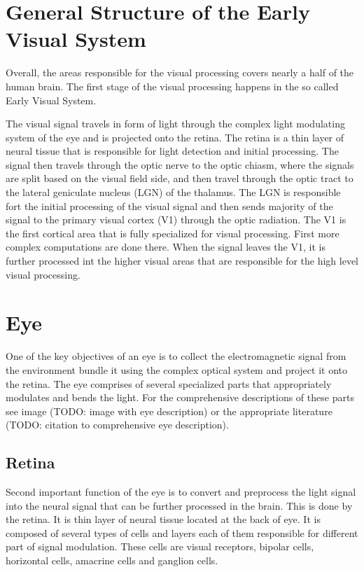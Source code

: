 \section{General Structure of the Early Visual System}
\label{sec:general_structure}
Overall, the areas responsible for the visual processing covers nearly 
a half of the human brain. The first stage of the visual processing happens in
the so called Early Visual System.

The visual signal travels in form of light through the complex light modulating
system of the eye and is projected onto the retina. The retina is a thin layer
of neural tissue that is responsible for light detection and initial processing.
The signal then travels through the optic nerve to the optic chiasm, where the 
signals are split based on the visual field side, and then travel through the
optic tract to the lateral geniculate nucleus (LGN) of the thalamus. The LGN is
responsible fort the initial processing of the visual signal and then sends majority
of the signal to the primary visual cortex (V1) through the optic radiation. The
V1 is the first cortical area that is fully specialized for visual processing. 
First more complex computations are done there. When the signal leaves the V1,
it is further processed int the higher visual areas that are responsible for the
high level visual processing.

\section{Eye}
\label{sec:eye}
One of the key objectives of an eye is to collect the electromagnetic signal
from the environment bundle it using the complex optical system and project it
onto the retina. The eye comprises of several specialized parts that appropriately
modulates and bends the light. For the comprehensive descriptions of these 
parts see image (TODO: image with eye description) or the appropriate literature
(TODO: citation to comprehensive eye description).

\subsection{Retina}
\label{subsec:retina}
Second important function of the eye is to convert and preprocess the 
light signal into the neural signal that can be further processed in the brain.
This is done by the retina. It is thin layer of neural tissue located at the back
of eye. It is composed of several types of cells and layers each of them responsible
for different part of signal modulation. These cells are visual receptors,
bipolar cells, horizontal cells, amacrine cells and ganglion cells.


